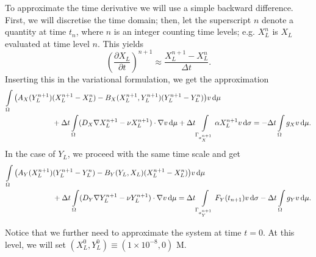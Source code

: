 \documentclass[a4paper,doc,11pt]{article}
\begin{document}
To approximate the time derivative we will use a simple backward difference. First, we will discretise the time domain; then, let the superscript $n$ denote a quantity at time $t_n$, where $n$ is an integer counting time levels; e.g. $X_L^n$ is $X_L$ evaluated at time level $n$. This yields
\begin{equation}
    \left(\frac{\partial X_L}{\partial t}\right)^{n+1} \approx \frac{X_L^{n+1} - X_L^n}{\Delta t}.
\end{equation}
Inserting this in the variational formulation, we get the approximation
\begin{equation}
\begin{aligned}
    \int\limits_\Omega
    \big(
    A_X(Y_L^{n+1}) &(X_L^{n+1} - X_L^n) - B_X(X_L^{n+1},Y_L^{n+1}) (Y_L^{n+1} - Y_L^n)  
    \big) v \dif \mu
    \\
    &+
    \Delta t \int\limits_\Omega        (D_X \nabla X_L^{n+1} - \nu X_L^{n+1}) \cdot \nabla v  \dif \mu
    +
    \Delta t \int\limits_{\Gamma_{a_X^{n+1}}}    \alpha X_L^{n+1} v    \dif \sigma
    =
    -\Delta t \int\limits_\Omega        g_X v \dif \mu.
\end{aligned}
\end{equation}
In the case of $Y_L$, we proceed with the same time scale and get
\begin{equation}
\begin{aligned}
    \int\limits_\Omega
    \big(
        A_Y(X_L^{n+1}) & (Y_L^{n+1} - Y_L^n)  - B_Y(Y_L,X_L) (X_L^{n+1} - X_L^n)
    \big) v \dif \mu
    \\
    &
    + \Delta t\int\limits_\Omega        (D_Y \nabla Y_L^{n+1} - \nu Y_L^{n+1}) \cdot \nabla v  \dif \mu
    =
    \Delta t\int\limits_{\Gamma_{a_Y^{n+1}}}     F_Y(t_{n+1}) v    \dif \sigma
    -\Delta t\int\limits_\Omega        g_Y v \dif \mu.
\end{aligned}
\end{equation}

Notice that we further need to approximate the system at time \(t=0\). At this level, we will set \( (X_L^0,Y_L^0) \equiv (1\times 10^{-8},0)\) M.












\newpage
\end{document}
